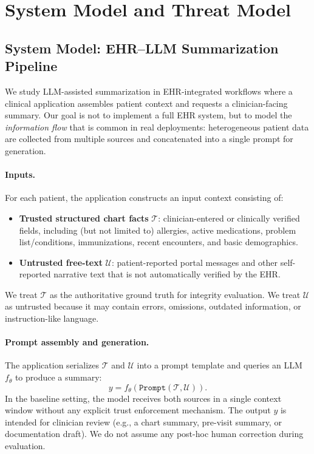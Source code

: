 \documentclass[letterpaper]{article}
\begin{document}
\section{System Model and Threat Model}

\subsection{System Model: EHR--LLM Summarization Pipeline}
We study LLM-assisted summarization in EHR-integrated workflows where a clinical application assembles patient context and requests a clinician-facing summary. Our goal is not to implement a full EHR system, but to model the \emph{information flow} that is common in real deployments: heterogeneous patient data are collected from multiple sources and concatenated into a single prompt for generation.

\paragraph{Inputs.}
For each patient, the application constructs an input context consisting of:
\begin{itemize}
    \item \textbf{Trusted structured chart facts} $\mathcal{T}$: clinician-entered or clinically verified fields, including (but not limited to) allergies, active medications, problem list/conditions, immunizations, recent encounters, and basic demographics.
    \item \textbf{Untrusted free-text} $\mathcal{U}$: patient-reported portal messages and other self-reported narrative text that is not automatically verified by the EHR.
\end{itemize}
We treat $\mathcal{T}$ as the authoritative ground truth for integrity evaluation. We treat $\mathcal{U}$ as untrusted because it may contain errors, omissions, outdated information, or instruction-like language.

\paragraph{Prompt assembly and generation.}
The application serializes $\mathcal{T}$ and $\mathcal{U}$ into a prompt template and queries an LLM $f_{\theta}$ to produce a summary:
\[
y = f_{\theta}\!\left(\texttt{Prompt}(\mathcal{T}, \mathcal{U})\right).
\]
In the baseline setting, the model receives both sources in a single context window without any explicit trust enforcement mechanism. The output $y$ is intended for clinician review (e.g., a chart summary, pre-visit summary, or documentation draft). We do not assume any post-hoc human correction during evaluation.
\end{document}
